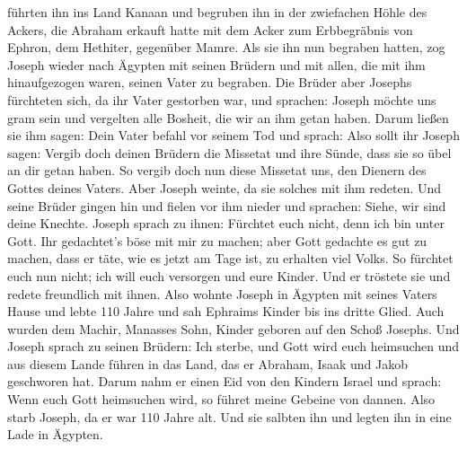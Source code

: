 führten ihn ins Land Kanaan und begruben ihn in der zwiefachen Höhle des
Ackers, die Abraham erkauft hatte mit dem Acker zum Erbbegräbnis von
Ephron, dem Hethiter, gegenüber Mamre.  Als sie ihn nun
begraben hatten, zog Joseph wieder nach Ägypten mit seinen Brüdern und
mit allen, die mit ihm hinaufgezogen waren, seinen Vater zu begraben.
 Die Brüder aber Josephs fürchteten sich, da ihr Vater
gestorben war, und sprachen: Joseph möchte uns gram sein und vergelten
alle Bosheit, die wir an ihm getan haben.  Darum ließen sie
ihm sagen: Dein Vater befahl vor seinem Tod und sprach: 
Also sollt ihr Joseph sagen: Vergib doch deinen Brüdern die Missetat und
ihre Sünde, dass sie so übel an dir getan haben. So vergib doch nun
diese Missetat uns, den Dienern des Gottes deines Vaters. Aber Joseph
weinte, da sie solches mit ihm redeten.  Und seine Brüder
gingen hin und fielen vor ihm nieder und sprachen: Siehe, wir sind deine
Knechte.  Joseph sprach zu ihnen: Fürchtet euch nicht, denn
ich bin unter Gott.  Ihr gedachtet's böse mit mir zu
machen; aber Gott gedachte es gut zu machen, dass er täte, wie es jetzt
am Tage ist, zu erhalten viel Volks.  So fürchtet euch nun
nicht; ich will euch versorgen und eure Kinder. Und er tröstete sie und
redete freundlich mit ihnen.  Also wohnte Joseph in Ägypten
mit seines Vaters Hause und lebte 110 Jahre  und sah
Ephraims Kinder bis ins dritte Glied. Auch wurden dem Machir, Manasses
Sohn, Kinder geboren auf den Schoß Josephs.  Und Joseph
sprach zu seinen Brüdern: Ich sterbe, und Gott wird euch heimsuchen und
aus diesem Lande führen in das Land, das er Abraham, Isaak und Jakob
geschworen hat.  Darum nahm er einen Eid von den Kindern
Israel und sprach: Wenn euch Gott heimsuchen wird, so führet meine
Gebeine von dannen.  Also starb Joseph, da er war 110 Jahre
alt. Und sie salbten ihn und legten ihn in eine Lade in Ägypten.
